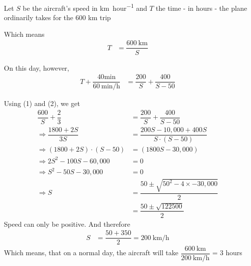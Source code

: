 \begin{solution}
	Let $S$ be the aircraft's speed in \si{km\per hour} and $T$ the time - in hours -
	the plane ordinarily takes for the 600 km trip
	
	Which means
	\begin{align}
		T &= \dfrac{\SI{600}{\kilo\meter}}{S}
	\end{align}
	
	On this day, however,
	\begin{align}
		T + \dfrac{40 \si{\minute}}{\SI{60}{\minute\per\hour}} &= \dfrac{200}{S} + \dfrac{400}{S-50}
	\end{align}
	
	Using (1) and (2), we get 
	\begin{align}
		\dfrac{600}{S} + \dfrac{2}{3} &= \dfrac{200}{S} + \dfrac{400}{S-50} \\
		\Rightarrow \dfrac{1800+2S}{3S} &= \dfrac{200S-10,000+400S}{S\cdot(S-50)} \\
		\Rightarrow (1800+2S)\cdot(S-50) &= (1800S - 30,000) \\
		\Rightarrow 2S^2-100S-60,000 &= 0 \\
		\Rightarrow S^2-50S-30,000 &= 0 \\
		\Rightarrow S &= \dfrac{50\pm\sqrt{50^2-4\times-30,000}}{2} \\
		              &= \dfrac{50\pm\sqrt{122500}}{2}
	\end{align}
	Speed can only be positive. And therefore
	\begin{align}
		S &= \dfrac{50+350}{2} = \SI{200}{\kilo\meter\per\hour}
	\end{align}
	Which means, that on a normal day, the aircraft will take 
	$\dfrac{\SI{600}{\kilo\meter}}{\SI{200}{\kilo\meter\per\hour}}$ = 3 hours
	
\end{solution}
